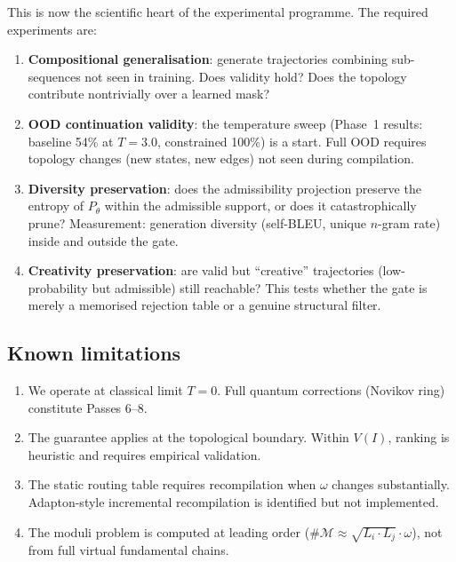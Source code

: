 \documentclass[11pt,a4paper]{article}
\begin{document}
This is now the scientific heart of the experimental programme.
The required experiments are:
\begin{enumerate}[label=(\roman*)]
  \item \textbf{Compositional generalisation}: generate trajectories
        combining sub-sequences not seen in training.
        Does validity hold? Does the topology contribute nontrivially
        over a learned mask?
  \item \textbf{OOD continuation validity}: the temperature sweep
        (Phase~1 results: baseline 54\% at $T=3.0$, constrained
        100\%) is a start. Full OOD requires topology changes
        (new states, new edges) not seen during compilation.
  \item \textbf{Diversity preservation}: does the admissibility
        projection preserve the entropy of $P_\theta$ within the
        admissible support, or does it catastrophically prune?
        Measurement: generation diversity (self-BLEU, unique
        $n$-gram rate) inside and outside the gate.
  \item \textbf{Creativity preservation}: are valid but
        ``creative'' trajectories (low-probability but admissible)
        still reachable? This tests whether the gate is merely
        a memorised rejection table or a genuine structural filter.
\end{enumerate}

\subsection{Known limitations}

\begin{enumerate}[label=(\roman*)]
  \item We operate at classical limit $T=0$. Full quantum
        corrections (Novikov ring) constitute Passes 6--8.
  \item The guarantee applies at the topological boundary.
        Within $V(I)$, ranking is heuristic and requires
        empirical validation.
  \item The static routing table requires recompilation when
        $\omega$ changes substantially. Adapton-style incremental
        recompilation is identified but not implemented.
  \item The moduli problem is computed at leading order
        ($\#\mathcal{M} \approx \sqrt{L_i \cdot L_j}\cdot\omega$),
        not from full virtual fundamental chains.
\end{enumerate}
\end{document}
